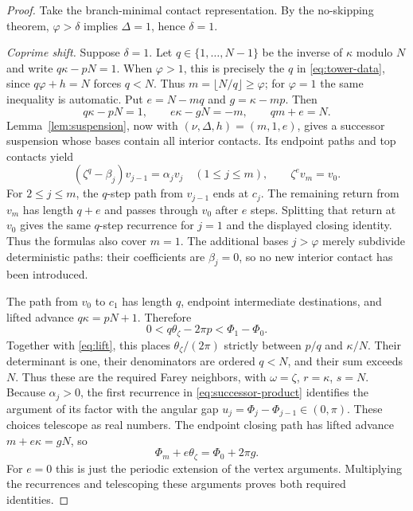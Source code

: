 \documentclass[11pt,a4paper]{article}
\theoremstyle{definition}
\theoremstyle{remark}
\numberwithin{equation}{section}
\begin{document}
\begin{proof}
Take the branch-minimal contact representation. By the no-skipping theorem, $\varphi>\delta$ implies $\Delta=1$, hence $\delta=1$.

\emph{Coprime shift.} Suppose $\delta=1$. Let $q\in\{1,\ldots,N-1\}$ be the inverse of $\kappa$ modulo $N$ and write $q\kappa-pN=1$. When $\varphi>1$, this is precisely the $q$ in \eqref{eq:tower-data}, since $q\varphi+h=N$ forces $q<N$. Thus $m=\lfloor N/q\rfloor\ge\varphi$; for $\varphi=1$ the same inequality is automatic. Put $e=N-mq$ and $g=\kappa-mp$. Then
\[
 q\kappa-pN=1,\qquad e\kappa-gN=-m,\qquad qm+e=N.
\]
Lemma~\ref{lem:suspension}, now with $(\nu,\Delta,h)=(m,1,e)$, gives a successor suspension whose bases contain all interior contacts. Its endpoint paths and top contacts yield
\begin{equation}\label{eq:successor-product}
 (\zeta^q-\beta_j)v_{j-1}=\alpha_jv_j\quad(1\le j\le m),
 \qquad \zeta^ev_m=v_0.
\end{equation}
For $2\le j\le m$, the $q$-step path from $v_{j-1}$ ends at $c_j$.
The remaining return from $v_m$ has length $q+e$ and passes through
$v_0$ after $e$ steps. Splitting that return at $v_0$ gives the same
$q$-step recurrence for $j=1$ and the displayed closing identity.
Thus the formulas also cover $m=1$. The additional bases
$j>\varphi$ merely subdivide deterministic paths: their coefficients
are $\beta_j=0$, so no new interior contact has been introduced.

The path from $v_0$ to $c_1$ has length $q$, endpoint intermediate destinations, and lifted advance $q\kappa=pN+1$. Therefore
\[
 0<q\theta_\zeta-2\pi p<\Phi_1-\Phi_0.
\]
Together with \eqref{eq:lift}, this places $\theta_\zeta/(2\pi)$ strictly between $p/q$ and $\kappa/N$. Their determinant is one, their denominators are ordered $q<N$, and their sum exceeds $N$. Thus these are the required Farey neighbors, with $\omega=\zeta$, $r=\kappa$, $s=N$.
Because $\alpha_j>0$, the first recurrence in
\eqref{eq:successor-product} identifies the argument of its factor
with the angular gap $u_j=\Phi_j-\Phi_{j-1}\in(0,\pi)$.
These choices telescope as real numbers. The endpoint closing path
has lifted advance $m+e\kappa=gN$, so
\[
 \Phi_m+e\theta_\zeta=\Phi_0+2\pi g.
\]
For $e=0$ this is just the periodic extension of the vertex arguments. Multiplying the recurrences and telescoping these arguments proves both required identities.


\end{proof}
\end{document}
